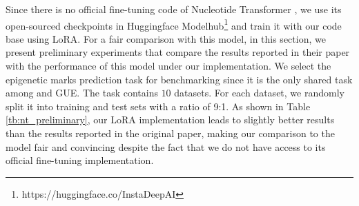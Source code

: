 \documentclass{article}
\begin{document}
Since there is no official fine-tuning code of Nucleotide Transformer \citep{nt}, we use its open-sourced checkpoints in Huggingface Modelhub\footnote{https://huggingface.co/InstaDeepAI} and train it with our code base using LoRA. For a fair comparison with this model, in this section, we present preliminary experiments that compare the results reported in their paper with the performance of this model under our implementation. We select the epigenetic marks prediction task for benchmarking since it is the only shared task among \citet{nt} and GUE. The task contains $10$ datasets. For each dataset, we randomly split it into training and test sets with a ratio of 9:1. As shown in  Table \ref{tb:nt_preliminary}, our LoRA implementation leads to slightly better results than the results reported in the original paper, making our comparison to the model fair and convincing despite the fact that we do not have access to its official fine-tuning implementation.
\end{document}
